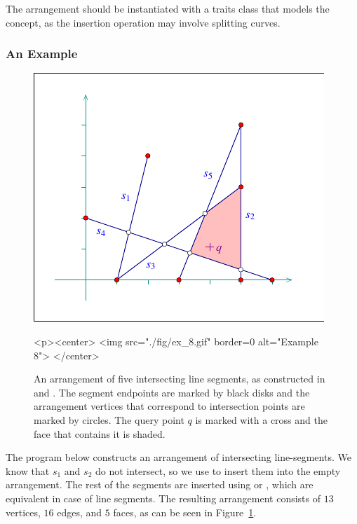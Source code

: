 The arrangement  should be instantiated with a traits class
that models the  concept, as the
insertion operation may involve splitting curves.

\subsubsection{An Example}
\label{arr_sssec:insert_ex}
%
\begin{figure}[!htp]
\begin{ccTexOnly}
  \begin{center}
  \includegraphics{Arrangement_2/fig/ex_8}
  \end{center}
\end{ccTexOnly}
\begin{ccHtmlOnly}
  <p><center>
  <img src="./fig/ex_8.gif" border=0 alt="Example 8">
  </center>
\end{ccHtmlOnly}
\caption{An arrangement of five intersecting line segments, as
constructed in  and
. The segment
endpoints are marked by black disks and the arrangement vertices
that correspond to intersection points are marked by circles.
The query point $q$ is marked with a cross and the face that
contains it is shaded.}
\label{arr_fig:ex_8}
\end{figure}

The program below constructs an arrangement of intersecting
line-segments. We know that $s_1$ and $s_2$ do not intersect, so
we use  to insert them into the
empty arrangement. The rest of the segments are inserted using
 or , which are
equivalent in case of line segments. The resulting arrangement consists
of $13$ vertices, $16$ edges, and $5$ faces, as can be seen in
Figure~\ref{arr_fig:ex_8}.

